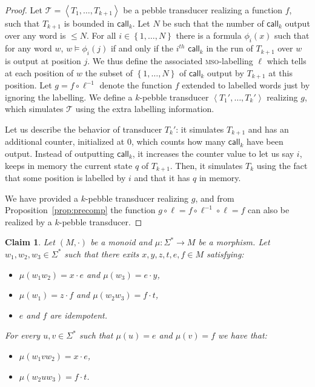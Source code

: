 \documentclass[sigplan,review,anonymous]{acmart}\settopmatter{printfolios=true,printccs=false,printacmref=false}
\newcommand{\set}[1]{\left\{#1 \right\}}
\newcommand{\atuple}[1]{\left\langle #1 \right\rangle}
\newcommand{\Tt}{\mathcal T}
\newcommand{\mso}{\textsc{mso}\xspace}
\newcommand{\call}{\mathsf {call}}
\newtheorem{claim}[theorem]{Claim}
\theoremstyle{definition}
\theoremstyle{remark}
\begin{document}
\begin{proof}
  Let $\Tt=\atuple{T_1,\ldots,T_{k+1}}$ be a pebble transducer realizing a function $f$, such that $T_{k+1}$ is bounded in $\call_k$. Let $N$ be such that the number of $\call_k$ output over any word is $\leq N$. For all $i\in \set{1,\ldots,N}$ there is a formula $\phi_i(x)$ such that for any word $w$, $w\models \phi_i(j)$ if and only if the $i^{th}$ $\call_k$ in the run of $T_{k+1}$ over $w$ is output at position $j$. We thus define the associated \mso-labelling $\ell$ which tells at each position of $w$ the subset of $\set{1,\ldots,N}$ of $\call_k$ output by $T_{k+1}$ at this position.
  Let $g=f\circ \ell^{-1}$ denote the function $f$ extended to labelled words just by ignoring the labelling.
  We define a $k$-pebble transducer $\atuple{T_1',\ldots,T_{k}'}$ realizing $g$, which simulates $\Tt$ using the extra labelling information. 

  Let us describe the behavior of transducer $T_k'$: it simulates $T_{k+1}$ and has an additional counter, initialized at $0$, which counts how many $\call_k$ have been output. Instead of outputting $\call_k$, it increases the counter value to let us say $i$, keeps in memory the current state $q$ of $T_{k+1}$. Then, it simulates $T_k$ using the fact that some position is labelled by $i$ and that it has $q$ in memory.

  We have provided a $k$-pebble transducer realizing $g$, and from Proposition~\ref{prop:precomp} the function $g\circ \ell=f\circ \ell^{-1}\circ \ell=f $ can also be realized by a $k$-pebble transducer.

\end{proof}





\begin{claim}\label{claim:2idem}
Let $(M,\cdot)$ be a monoid and $\mu:\Sigma^*\to M$ be a morphism. Let $w_1,w_2, w_3\in\Sigma^*$ such that there exits $x,y,z,t,e,f\in M$ satisfying:
\begin{itemize}
\item $\mu(w_1w_2)=x\cdot e$ and $\mu(w_3)=e\cdot y$,
\item $\mu(w_1)=z\cdot f$ and $\mu(w_2w_3)=f\cdot t$,
\item $e$ and $f$ are idempotent.
\end{itemize}
For every $u, v\in\Sigma^*$ such that $\mu(u)=e$ and $\mu(v)=f$ we have that:
\begin{itemize}
\item $\mu(w_1vw_2)=x\cdot e$, 
\item $\mu(w_2uw_3)=f\cdot t$.
\end{itemize}
\end{claim}
\end{document}
